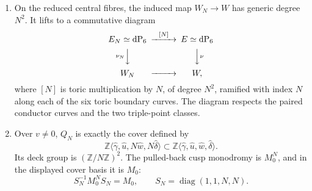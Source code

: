 \begin{theorem}
\begin{enumerate}
\item On the reduced central fibres, the induced map
$W_N\to W$ has generic degree $N^2$.  It lifts to a commutative diagram
\begin{equation}
\begin{CD}
 E_N\simeq\mathrm{dP}_6 @>{[N]}>> E\simeq\mathrm{dP}_6\\
 @V{\nu_N}VV @VV{\nu}V\\
 W_N @>>> W,
\end{CD}
 \label{cusp-cover-normalization-diagram}
\end{equation}
where $[N]$ is toric multiplication by $N$, of degree $N^2$, ramified
with index $N$ along each of the six toric boundary curves.  The diagram
respects the paired conductor curves and the two triple-point classes.

\item Over $v\ne0$, $Q_N$ is exactly the cover defined by
\[
 \mathbb Z\langle\widehat\gamma,\widehat u,
 N\widehat w,N\widehat\delta\rangle
 \subset
 \mathbb Z\langle\widehat\gamma,\widehat u,
 \widehat w,\widehat\delta\rangle.
\]
Its deck group is $(\mathbb Z/N\mathbb Z)^2$.  The pulled-back cusp
monodromy is $M_0^N$, and in the displayed cover basis it is $M_0$:
\begin{equation}
 S_N^{-1}M_0^NS_N=M_0,\qquad
 S_N=\operatorname{diag}(1,1,N,N).
 \label{cusp-cover-monodromy-conjugacy}
\end{equation}
\end{enumerate}
\end{theorem}

